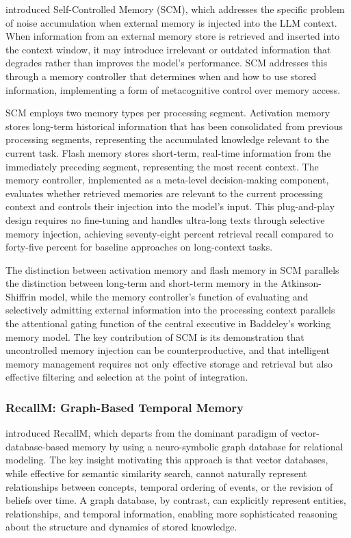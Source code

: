 \citet{liang2023scm} introduced Self-Controlled Memory (SCM), which addresses the specific problem of noise accumulation when external memory is injected into the LLM context. When information from an external memory store is retrieved and inserted into the context window, it may introduce irrelevant or outdated information that degrades rather than improves the model's performance. SCM addresses this through a memory controller that determines when and how to use stored information, implementing a form of metacognitive control over memory access.

SCM employs two memory types per processing segment. Activation memory stores long-term historical information that has been consolidated from previous processing segments, representing the accumulated knowledge relevant to the current task. Flash memory stores short-term, real-time information from the immediately preceding segment, representing the most recent context. The memory controller, implemented as a meta-level decision-making component, evaluates whether retrieved memories are relevant to the current processing context and controls their injection into the model's input. This plug-and-play design requires no fine-tuning and handles ultra-long texts through selective memory injection, achieving seventy-eight percent retrieval recall compared to forty-five percent for baseline approaches on long-context tasks.

The distinction between activation memory and flash memory in SCM parallels the distinction between long-term and short-term memory in the Atkinson-Shiffrin model, while the memory controller's function of evaluating and selectively admitting external information into the processing context parallels the attentional gating function of the central executive in Baddeley's working memory model. The key contribution of SCM is its demonstration that uncontrolled memory injection can be counterproductive, and that intelligent memory management requires not only effective storage and retrieval but also effective filtering and selection at the point of integration.

\subsubsection{RecallM: Graph-Based Temporal Memory}

\citet{kynoch2023recallm} introduced RecallM, which departs from the dominant paradigm of vector-database-based memory by using a neuro-symbolic graph database for relational modeling. The key insight motivating this approach is that vector databases, while effective for semantic similarity search, cannot naturally represent relationships between concepts, temporal ordering of events, or the revision of beliefs over time. A graph database, by contrast, can explicitly represent entities, relationships, and temporal information, enabling more sophisticated reasoning about the structure and dynamics of stored knowledge.

